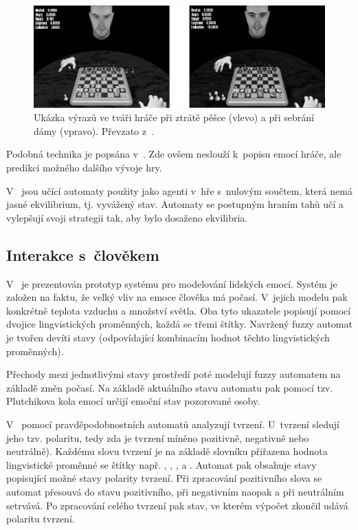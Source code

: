 \begin{figure}
 \centering
 \includegraphics[width=\textwidth]{genimg-chess-emos-screens}
 
 \caption[Ukázka výrazů ve tváři hráče]{Ukázka výrazů ve tváři hráče při ztrátě pěšce (vlevo) a při sebrání dámy (vpravo). Převzato z~\cite{AlvJoaCru-FuStMaAppEmoModEleGamCha}.} \label{img:ChessEmosScreens}
\end{figure}

Podobná technika je popsána v~\cite{Hua+-LeaProbAutModChe}. Zde ovšem neslouží k~popisu emocí hráče, ale predikci možného dalšího vývoje hry.

V~\cite{FuLi-ForLeaAutAutGam} jsou učící automaty použity jako agenti v~hře s~nulovým součtem, která nemá jasné ekvilibrium, tj. vyvážený stav. Automaty se postupným hraním tahů učí a vylepšují svoji strategii tak, aby bylo dosaženo ekvilibria.

\subsection{Interakce s~člověkem}
V~\cite{HeiTri-SimEmoPerHumComInt} je prezentován prototyp systému pro modelování lidských emocí. Systém je založen na faktu, že velký vliv na emoce člověka má počasí. V~jejich modelu pak konkrétně teplota vzduchu a množství světla. Oba tyto ukazatele popisují pomocí dvojice lingvistických proměnných, každá se třemi štítky. Navržený fuzzy automat je tvořen devíti stavy (odpovídající kombinacím hodnot těchto lingvistických proměnných).

Přechody mezi jednotlivými stavy prostředí poté modelují fuzzy automatem na základě změn počasí. Na základě aktuálního stavu automatu pak pomocí tzv. Plutchikova kola emocí určijí emoční stav pozorované osoby.


V~\cite{Cas+-ProAutAspBasSenAna} pomocí pravděpodobnostních automatů analyzují tvrzení. U~tvrzení sledují jeho tzv. polaritu, tedy zda je tvrzení míněno pozitivně, negativně nebo neutrálně). Každému slovu tvrzení je na základě slovníku přiřazena hodnota lingvistické proměnné  se štítky např. , , ,  a . Automat pak obsahuje stavy popisující možné stavy polarity tvrzení. Při zpracování pozitivního slova se automat přesouvá do stavu  pozitivního, při negativním naopak a při neutrálním setrvává. Po zpracování celého tvrzení pak stav, ve kterém výpočet zkončil udává polaritu tvrzení.

